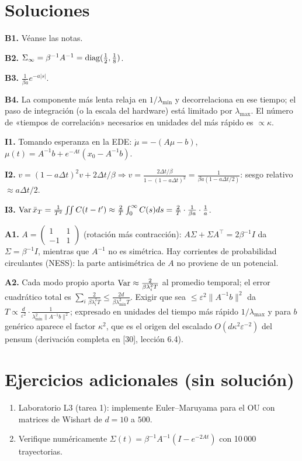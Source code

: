 \documentclass[11pt,a4paper]{article}
\begin{document}
\section{Soluciones}
\begin{solucion}
\textbf{B1.} Véanse las notas.

\textbf{B2.} $\Sigma_\infty=\beta^{-1}A^{-1}=\operatorname{diag}(\frac12,\frac18)$.

\textbf{B3.} $\frac{1}{\beta a}e^{-a|s|}$.

\textbf{B4.} La componente más lenta relaja en $1/\lambda_{\min}$ y decorrelaciona en ese tiempo; el paso de integración (o la escala del hardware) está limitado por $\lambda_{\max}$. El número de «tiempos de correlación» necesarios en unidades del más rápido es $\propto\kappa$.

\textbf{I1.} Tomando esperanza en la EDE: $\dot\mu=-(A\mu-b)$, $\mu(t)=A^{-1}b+e^{-At}(x_0-A^{-1}b)$.

\textbf{I2.} $v=(1-a\Delta t)^2v+2\Delta t/\beta\Rightarrow v=\frac{2\Delta t/\beta}{1-(1-a\Delta t)^2}=\frac{1}{\beta a(1-a\Delta t/2)}$: sesgo relativo $\approx a\Delta t/2$.

\textbf{I3.} $\operatorname{Var}\bar x_T=\frac1{T^2}\iint C(t-t')\approx\frac{2}{T}\int_0^\infty C(s)ds=\frac2T\cdot\frac{1}{\beta a}\cdot\frac1a$.

\textbf{A1.} $A=\begin{pmatrix}1&1\\-1&1\end{pmatrix}$ (rotación más contracción): $A\Sigma+\Sigma A^\top=2\beta^{-1}I$ da $\Sigma=\beta^{-1}I$, mientras que $A^{-1}$ no es simétrica. Hay corrientes de probabilidad circulantes (NESS): la parte antisimétrica de $A$ no proviene de un potencial.

\textbf{A2.} Cada modo propio aporta $\operatorname{Var}\approx\frac{2}{\beta\lambda_i^2T}$ al promedio temporal; el error cuadrático total es $\sum_i\frac{2}{\beta\lambda_i^2T}\le\frac{2d}{\beta\lambda_{\min}^2T}$. Exigir que sea $\le\varepsilon^2\|A^{-1}b\|^2$ da $T\propto\frac{d}{\varepsilon^2}\cdot\frac{1}{\lambda_{\min}^2\|A^{-1}b\|^2}$; expresado en unidades del tiempo más rápido $1/\lambda_{\max}$ y para $b$ genérico aparece el factor $\kappa^2$, que es el origen del escalado $O(d\kappa^2\varepsilon^{-2})$ del pensum (derivación completa en [30], lección 6.4).
\end{solucion}

\section{Ejercicios adicionales (sin solución)}
\begin{enumerate}[label=\textbf{P\arabic*.}]
\item Laboratorio L3 (tarea 1): implemente Euler--Maruyama para el OU con matrices de Wishart de $d=10$ a $500$.
\item Verifique numéricamente $\Sigma(t)=\beta^{-1}A^{-1}(I-e^{-2At})$ con 10\,000 trayectorias.
\end{enumerate}
\end{document}
